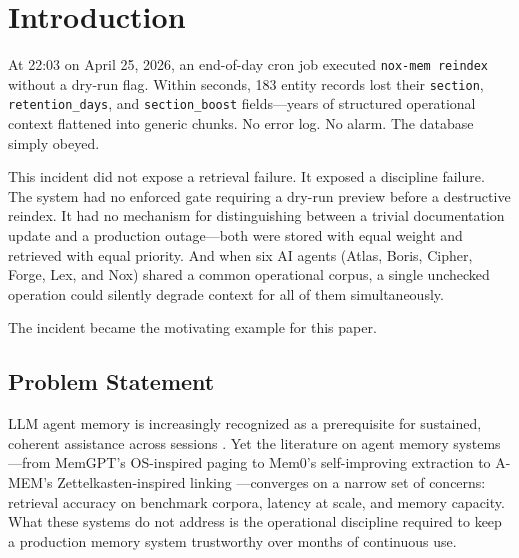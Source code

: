 
\section{Introduction}

At 22:03 on April 25, 2026, an end-of-day cron job executed \texttt{nox-mem reindex}
without a dry-run flag. Within seconds, 183 entity records lost their \texttt{section},
\texttt{retention\_days}, and \texttt{section\_boost} fields---years of structured
operational context flattened into generic chunks. No error log. No alarm. The database
simply obeyed.

This incident did not expose a retrieval failure. It exposed a discipline failure. The
system had no enforced gate requiring a dry-run preview before a destructive reindex. It
had no mechanism for distinguishing between a trivial documentation update and a production
outage---both were stored with equal weight and retrieved with equal priority. And when six
AI agents (Atlas, Boris, Cipher, Forge, Lex, and Nox) shared a common operational corpus,
a single unchecked operation could silently degrade context for all of them simultaneously.

The incident became the motivating example for this paper.

\subsection{Problem Statement}

LLM agent memory is increasingly recognized as a prerequisite for sustained, coherent
assistance across sessions \cite{lewis2020rag, packer2023memgpt}. Yet the literature on
agent memory systems---from MemGPT's OS-inspired paging \cite{packer2023memgpt} to Mem0's
self-improving extraction \cite{chhikara2025mem0} to A-MEM's Zettelkasten-inspired linking
\cite{xu2025amem}---converges on a narrow set of concerns: retrieval accuracy on benchmark
corpora, latency at scale, and memory capacity. What these systems do not address is the
operational discipline required to keep a production memory system trustworthy over months
of continuous use.

